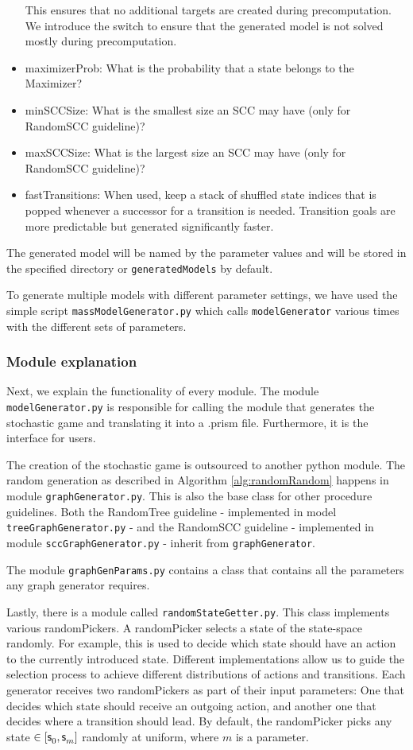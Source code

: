 \begin{itemize}
    This ensures that no additional targets are created during precomputation. 
    We introduce the switch to ensure that the generated model is not solved mostly during precomputation.
    \item maximizerProb: What is the probability that a state belongs to the Maximizer?
    \item minSCCSize: What is the smallest size an SCC may have (only for RandomSCC guideline)?
    \item maxSCCSize: What is the largest size an SCC may have (only for RandomSCC guideline)?
    \item fastTransitions: When used, keep a stack of shuffled state indices that is popped whenever a successor for a transition is needed. 
    Transition goals are more predictable but generated significantly faster.
\end{itemize}

The generated model will be named by the parameter values and will be stored in the specified directory or \texttt{generatedModels} by default.

To generate multiple models with different parameter settings, we have used the simple script \texttt{massModelGenerator.py} which calls \texttt{modelGenerator} various times with the different sets of parameters.

\subsubsection*{Module explanation}
Next, we explain the functionality of every module. The module \texttt{modelGenerator.py} is responsible for calling the module that generates the stochastic game and translating it into a .prism file. 
Furthermore, it is the interface for users.

The creation of the stochastic game is outsourced to another python module. The random generation as described in Algorithm \ref{alg:randomRandom} happens in
module \texttt{graphGenerator.py}. This is also the base class for other procedure guidelines. 
Both the RandomTree guideline - implemented in model \texttt{treeGraphGenerator.py} - and the RandomSCC guideline - implemented in module \texttt{sccGraphGenerator.py} - inherit
from \texttt{graphGenerator}.

The module \texttt{graphGenParams.py} contains a class that contains all the parameters any graph generator requires. 

Lastly, there is a module called \texttt{randomStateGetter.py}. This class implements various randomPickers.
A randomPicker selects a state of the state-space randomly.
For example, this is used to decide which state should have an action to the currently introduced state.
Different implementations allow us to guide the selection process to achieve different distributions of actions and transitions.
Each generator receives two randomPickers as part of their input parameters: One that decides which state should receive an outgoing action, 
and another one that decides where a transition should lead. By default, the randomPicker picks any state $\in [\initstate, \state<m>]$ randomly at uniform, where $m$ is a parameter.

